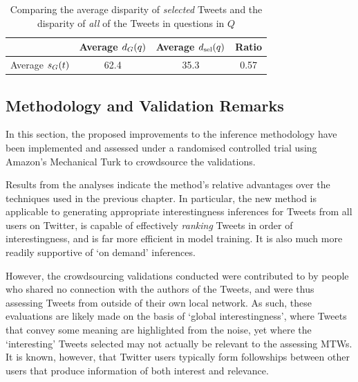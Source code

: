 \begin{table}[h]\footnotesize
\begin{center}
\begin{tabular}{ l || c | c | c }
      & Average $d_G(q)$ & Average $d_{\textrm{sel}}(q)$ & Ratio \\
	 \hline
     \hline
    Average $s_G(t)$ & 62.4 & 35.3 & 0.57 \\ 
     \hline
\end{tabular}
\end{center}
\caption{Comparing the average disparity of \textit{selected} Tweets and the disparity of \textit{all} of the Tweets in questions in $Q$}
\label{table:score-disparities-2}
\end{table}


\subsection{Methodology and Validation Remarks}
In this section, the proposed improvements to the inference methodology have been implemented and assessed under a randomised controlled trial using Amazon's Mechanical Turk to crowdsource the validations.

Results from the analyses indicate the method's relative advantages over the techniques used in the previous chapter. In particular, the new method is applicable to generating appropriate interestingness inferences for Tweets from all users on Twitter, is capable of effectively \textit{ranking} Tweets in order of interestingness, and is far more efficient in model training. It is also much more readily supportive of `on demand' inferences.

However, the crowdsourcing validations conducted were contributed to by people who shared no connection with the authors of the Tweets, and were thus assessing Tweets from outside of their own local network. As such, these evaluations are likely made on the basis of `global interestingness', where Tweets that convey some meaning are highlighted from the noise, yet where the `interesting' Tweets selected may not actually be relevant to the assessing MTWs. It is known, however, that Twitter users typically form followships between other users that produce information of both interest and relevance.

